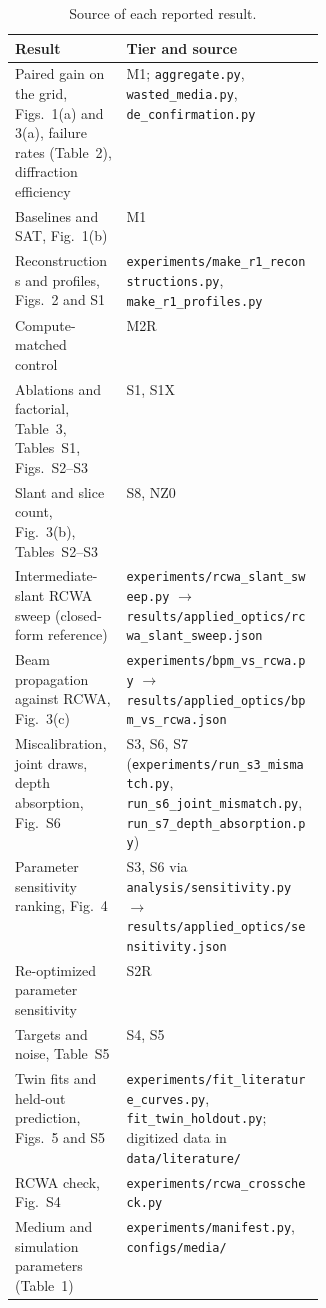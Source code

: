 \documentclass{optica-article}
\begin{document}
\begin{table}[!htbp]
\centering
\caption{Source of each reported result.}
\label{tab:s6}
\small
\renewcommand{\arraystretch}{1.15}
\begin{tabularx}{\linewidth}{>{\raggedright\arraybackslash}p{0.36\linewidth} X}
\toprule
Result & Tier and source \\
\midrule
Paired gain on the grid, Figs.~1(a) and 3(a), failure rates (Table~2), diffraction efficiency & M1; \texttt{aggregate.py}, \texttt{wasted\_media.py}, \texttt{de\_confirmation.py} \\
Baselines and SAT, Fig.~1(b) & M1 \\
Reconstructions and profiles, Figs.~2 and S1 & \texttt{experiments/make\_r1\_reconstructions.py}, \texttt{make\_r1\_profiles.py} \\
Compute-matched control & M2R \\
Ablations and factorial, Table~3, Tables~S1, Figs.~S2--S3 & S1, S1X \\
Slant and slice count, Fig.~3(b), Tables~S2--S3 & S8, NZ0 \\
Intermediate-slant RCWA sweep (closed-form reference) & \texttt{experiments/rcwa\_slant\_sweep.py} $\rightarrow$ \texttt{results/applied\_optics/rcwa\_slant\_sweep.json} \\
Beam propagation against RCWA, Fig.~3(c) & \texttt{experiments/bpm\_vs\_rcwa.py} $\rightarrow$ \texttt{results/applied\_optics/bpm\_vs\_rcwa.json} \\
Miscalibration, joint draws, depth absorption, Fig.~S6 & S3, S6, S7 (\texttt{experiments/run\_s3\_mismatch.py}, \texttt{run\_s6\_joint\_mismatch.py}, \texttt{run\_s7\_depth\_absorption.py}) \\
Parameter sensitivity ranking, Fig.~4 & S3, S6 via \texttt{analysis/sensitivity.py} $\rightarrow$ \texttt{results/applied\_optics/sensitivity.json} \\
Re-optimized parameter sensitivity & S2R \\
Targets and noise, Table~S5 & S4, S5 \\
Twin fits and held-out prediction, Figs.~5 and S5 & \texttt{experiments/fit\_literature\_curves.py}, \texttt{fit\_twin\_holdout.py}; digitized data in \texttt{data/literature/} \\
RCWA check, Fig.~S4 & \texttt{experiments/rcwa\_crosscheck.py} \\
Medium and simulation parameters (Table~1) & \texttt{experiments/manifest.py}, \texttt{configs/media/} \\
\bottomrule
\end{tabularx}
\end{table}


\end{document}

